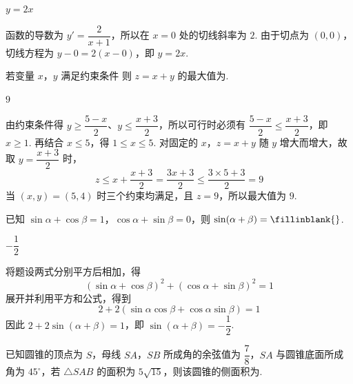 \begin{answer}
\(y=2x\)
\end{answer}

\begin{solution}
函数的导数为 \(y'=\dfrac2{x+1}\)，所以在 \(x=0\) 处的切线斜率为 \(2\). 由于切点为 \((0,0)\)，切线方程为
\(y-0=2(x-0)\)，即 \(y=2x\).
\end{solution}

\begin{problem}
若变量 \(x\)，\(y\) 满足约束条件
则 \(z=x+y\) 的最大值为\fillinblank{}.
\end{problem}

\begin{answer}
\(9\)
\end{answer}

\begin{solution}
由约束条件得
\(y\ge\dfrac{5-x}{2}\)、\(y\le\dfrac{x+3}{2}\)，所以可行时必须有
\(\dfrac{5-x}{2}\le\dfrac{x+3}{2}\)，即 \(x\ge1\). 再结合 \(x\le5\)，得
\(1\le x\le5\). 对固定的 \(x\)，\(z=x+y\) 随 \(y\) 增大而增大，故取
\(y=\dfrac{x+3}{2}\) 时，
\[
z\le x+\frac{x+3}{2}=\frac{3x+3}{2}\le\frac{3\times5+3}{2}=9
\]
当 \((x,y)=(5,4)\) 时三个约束均满足，且 \(z=9\)，所以最大值为 \(9\).
\end{solution}

\begin{problem}
已知 \(\sin\alpha+\cos\beta=1\)，\(\cos\alpha+\sin\beta=0\)，则 \(\sin(\alpha+\beta)=\fillinblank{}\).
\end{problem}

\begin{answer}
\(-\dfrac12\)
\end{answer}

\begin{solution}
将题设两式分别平方后相加，得
\[
(\sin\alpha+\cos\beta)^2+(\cos\alpha+\sin\beta)^2=1
\]
展开并利用平方和公式，得到
\[
2+2(\sin\alpha\cos\beta+\cos\alpha\sin\beta)=1
\]
因此 \(2+2\sin(\alpha+\beta)=1\)，即
\(\sin(\alpha+\beta)=-\dfrac12\).
\end{solution}

\begin{problem}
已知圆锥的顶点为 \(S\)，母线 \(SA\)，\(SB\) 所成角的余弦值为 \(\dfrac78\)，\(SA\) 与圆锥底面所成角为 \(45^\circ\)，若 \(\triangle SAB\) 的面积为 \(5\sqrt{15}\)，则该圆锥的侧面积为\fillinblank{}.
\end{problem}

